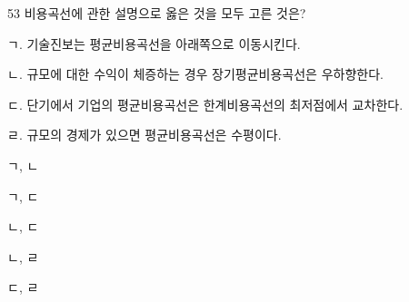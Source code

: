 \begin{question}{53}
비용곡선에 관한 설명으로 옳은 것을 모두 고른 것은?
\begin{framedtext}
ㄱ. 기술진보는 평균비용곡선을 아래쪽으로 이동시킨다. \par
ㄴ. 규모에 대한 수익이 체증하는 경우 장기평균비용곡선은 우하향한다. \par
ㄷ. 단기에서 기업의 평균비용곡선은 한계비용곡선의 최저점에서 교차한다. \par
ㄹ. 규모의 경제가 있으면 평균비용곡선은 수평이다. \par
\end{framedtext}
\begin{choices}
  \item ㄱ, ㄴ
  \item ㄱ, ㄷ
  \item ㄴ, ㄷ
  \item ㄴ, ㄹ
  \item ㄷ, ㄹ
\end{choices}
\end{question}
